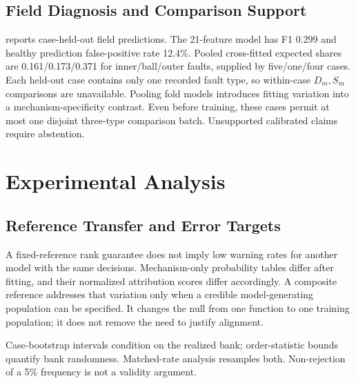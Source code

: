 \documentclass[conference]{IEEEtran}
\begin{document}
\subsection{Field Diagnosis and Comparison Support}
 reports case-held-out field predictions. The 21-feature model has F1 0.299 and healthy prediction false-positive rate 12.4\%. Pooled cross-fitted expected shares are 0.161/0.173/0.371 for inner/ball/outer faults, supplied by five/one/four cases. Each held-out case contains only one recorded fault type, so within-case $D_m,S_m$ comparisons are unavailable. Pooling fold models introduces fitting variation into a mechanism-specificity contrast. Even before training, these cases permit at most one disjoint three-type comparison batch. Unsupported calibrated claims require abstention.

\begin{table}[t]
\centering
\caption{SCA case-held-out predictions, with cases weighted equally. FPR is prediction error, distinct from explanation-warning size. Case 11 uses 38 test-period measurements and the frozen ensemble.}
\label{tab:sca-field}
\footnotesize

\end{table}

\section{Experimental Analysis}
\label{sec:analysis}
\subsection{Reference Transfer and Error Targets}
A fixed-reference rank guarantee does not imply low warning rates for another model with the same decisions. Mechanism-only probability tables differ after fitting, and their normalized attribution scores differ accordingly. A composite reference addresses that variation only when a credible model-generating population can be specified. It changes the null from one function to one training population; it does not remove the need to justify alignment.

Case-bootstrap intervals condition on the realized bank; order-statistic bounds quantify bank randomness. Matched-rate analysis resamples both. Non-rejection of a 5\% frequency is not a validity argument.
\end{document}
